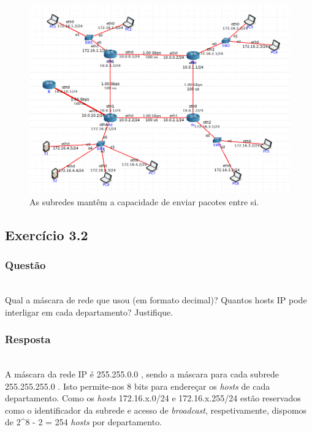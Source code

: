 \documentclass{llncs}
\begin{document}
\begin{figure}
	\begin{center}
	\includegraphics[scale=0.35]{./imagens/redeIPSnovos.png} 
	\end{center}
	\caption{\label{fig:ping}As subredes mantêm a capacidade de enviar pacotes entre si.}
\end{figure} 


\subsection{Exercício 3.2}
\subsubsection{Questão}\rule[-10pt]{0pt}{10pt}\\

Qual a máscara de rede que usou (em formato decimal)? Quantos hosts IP pode interligar em cada departamento? Justifique.

\subsubsection{Resposta}\rule[-10pt]{0pt}{10pt}\\

A máscara da rede IP é 255.255.0.0 , sendo a máscara para cada subrede 255.255.255.0 . Isto permite-nos 8 bits para endereçar os \textit{hosts} de cada departamento. Como os \textit{hosts} 172.16.x.0/24 e 172.16.x.255/24 estão reservados como o identificador da subrede e acesso de \textit{broadcast}, respetivamente, dispomos de 2\^{}8 - 2 = 254 \textit{hosts} por departamento. 
\end{document}
